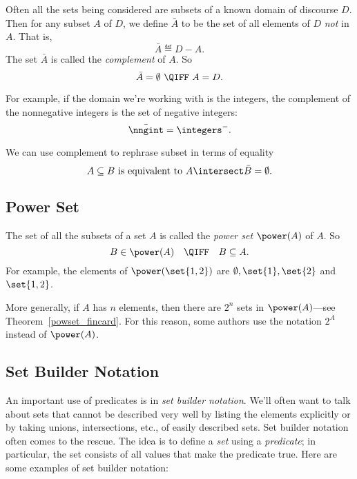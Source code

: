 Often all the sets being considered are subsets of a known domain
of discourse $D$.  Then for any subset $A$ of $D$, we define
$\bar{A}$ to be the set of all elements of $D$ \textit{not} in $A$.
That is,
\[
\bar{A} \eqdef D-A.
\]
The set $\bar{A}$ is called the \emph{complement}
  of $A$.  So
\[
\bar{A} = \emptyset\ \QIFF\ A = D.
\]

For example, if the domain we're working with is the integers, the
complement of the nonnegative integers is the set of negative integers:
\[
\bar{\nngint} = \integers^-.
\]

We can use complement to rephrase subset in terms of equality
\[
A \subseteq B \text{  is equivalent to  } A \intersect \bar{B} = \emptyset.
\]

\iffalse
It can be helpful to rephrase properties of sets using complements.  For
example, two sets $A$ and $B$ are said to be \term{disjoint} iff they
have no elements in common, that is, $A \intersect B = \emptyset$.  This
is the same as saying that $A$ is a subset of the complement of $B$, that
is, $A \subseteq \bar{B}$.
\fi

\subsection{Power Set}

The set of all the subsets of a set $A$ is called the \emph{power
  set}%
$\power(A)$ of $A$.  So
\[
B \in \power(A)\quad  \QIFF\quad  B \subseteq A.
\]
For example, the elements of $\power(\set{1, 2})$ are $\emptyset,
\set{1}, \set{2}$ and $\set{1, 2}$.

More generally, if $A$ has $n$ elements, then there are $2^n$ sets in
$\power(A)$---see Theorem~\ref{powset_fincard}.  For this reason,
some authors use the notation $2^A$ instead of $\power(A)$.

\subsection{Set Builder Notation}\label{set_builder_sec}

An important use of predicates is in%
\emph{set builder notation}.  We'll
often want to talk about sets that cannot be described very well by
listing the elements explicitly or by taking unions, intersections,
etc., of easily described sets.  Set builder notation often comes to the
rescue.  The idea is to define a \emph{set} using a \emph{predicate};
in particular, the set consists of all values that make the predicate
true.  Here are some examples of set builder notation:

